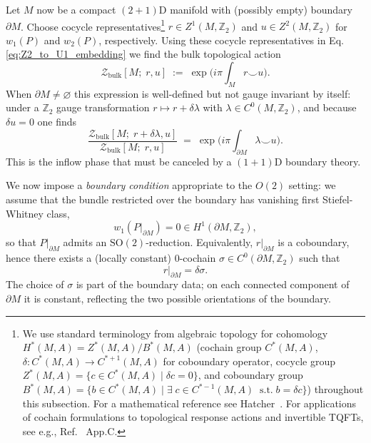 \documentclass[aps,prx,reprint,superscriptaddress,twocolumn,amsmath,amssymb,amsfonts, nofootinbib]{revtex4-2}
\newcommand{\SO}{\text{SO}}
\newcommand{\Z}{\mathbb{Z}}
\theoremstyle{apsstyle}
\begin{document}
Let $M$ now be a compact $(2{+}1)$D manifold with (possibly empty) boundary $\partial M$.  Choose cocycle representatives\footnote{We use standard terminology from algebraic topology for cohomology $H^*(M,A)=Z^{*}(M,A)/B^{*}(M,A)$ (cochain group $C^{*}(M, A)$, $\delta: C^{*}(M,A) \to C^{*+1}(M,A)$ for coboundary operator, cocycle group $Z^{*}(M, A)=\{c\in C^{*}(M, A)\;|\; \delta c=0\}$, and coboundary group $B^{*}(M, A)=\{b\in C^{*}(M,A)\;|\; \exists \;c\in C^{*-1}(M,A)\;\; \text{s.t.}\; b=\delta c\}$) throughout this subsection. For a mathematical reference see Hatcher~\cite{Hatcher_AT}. For applications of cochain formulations to topological response actions and invertible TQFTs, see e.g., Ref.~\cite{Tiwari2018} App.C.} $r\in Z^{1}(M,\Z_2)$ and $u\in Z^{2}(M,\Z_2)$ for $w_1(P)$ and $w_2(P)$,
respectively.  Using these cocycle representatives in Eq. \ref{eq:Z2_to_U1_embedding} we find the bulk topological action 
\begin{equation}
  \mathcal Z_{\mathrm{bulk}}\left[M;\;r,u\right]
  \;:=\;
  \exp \Big(i\pi \int_{M} r\smile u\Big).
  \label{eq:bulk_ru}
\end{equation}
When $\partial M\neq\varnothing$ this expression is well-defined but not gauge
invariant by itself: under a $\Z_2$ gauge transformation
$r\mapsto r+\delta\lambda$ with $\lambda\in C^{0}(M,\Z_2)$, and because $\delta u=0$ one finds
\begin{equation}
  \frac{\mathcal Z_{\mathrm{bulk}}\left[M;\;r+\delta\lambda,u\right]}
       {\mathcal Z_{\mathrm{bulk}}[M;\;r,u]}
  \;=\;
  \exp \Big(i\pi \int_{\partial M}\lambda\smile u\Big).
  \label{eq:bulk_variation}
\end{equation}
This is the inflow phase that must be canceled by a $(1{+}1)$D boundary theory.

\medskip

We now impose a \emph{boundary condition} appropriate to the $O(2)$ setting: we
assume that the bundle restricted over the boundary has vanishing first Stiefel-Whitney class,
\begin{equation}
  w_1(P|_{\partial M})=0\in H^{1}(\partial M,\Z_2),
  \label{eq:boundary_w1zero}
\end{equation}
so that $P|_{\partial M}$ admits an $\SO(2)$-reduction.  Equivalently,
$r|_{\partial M}$ is a coboundary, hence there exists a (locally constant)
$0$-cochain $\sigma\in C^{0}(\partial M,\Z_2)$ such that
\begin{equation}
  r|_{\partial M}=\delta\sigma.
  \label{eq:r_boundary_trivialization}
\end{equation}
The choice of $\sigma$ is part of the boundary data; on each connected component
of $\partial M$ it is constant, reflecting the two possible orientations of the boundary. 
\end{document}
